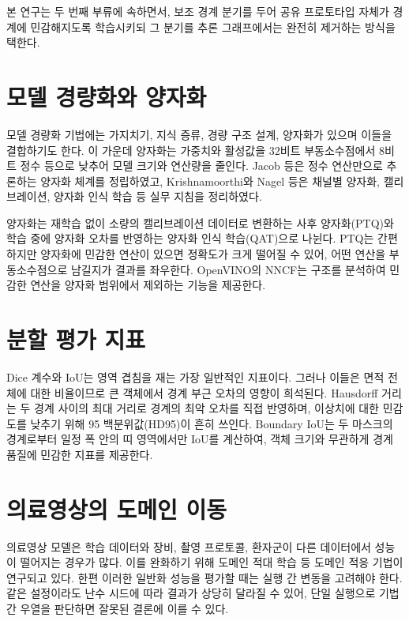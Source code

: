 본 연구는 두 번째 부류에 속하면서, 보조 경계 분기를 두어 공유 프로토타입 자체가 경계에 민감해지도록
학습시키되 그 분기를 추론 그래프에서는 완전히 제거하는 방식을 택한다.

\section{모델 경량화와 양자화}\label{sec:rw_quant}

모델 경량화 기법에는 가지치기, 지식 증류\citep{hinton2015distilling}, 경량 구조 설계, 양자화가 있으며
이들을 결합하기도 한다\citep{han2016deepcompression}. 이 가운데 양자화는 가중치와 활성값을 32비트
부동소수점에서 8비트 정수 등으로 낮추어 모델 크기와 연산량을 줄인다. Jacob 등\citep{jacob2018quantization}은
정수 연산만으로 추론하는 양자화 체계를 정립하였고, Krishnamoorthi\citep{krishnamoorthi2018whitepaper}와
Nagel 등\citep{nagel2021whitepaper}은 채널별 양자화, 캘리브레이션, 양자화 인식 학습 등 실무 지침을 정리하였다.

양자화는 재학습 없이 소량의 캘리브레이션 데이터로 변환하는 사후 양자화(PTQ)와 학습 중에 양자화
오차를 반영하는 양자화 인식 학습(QAT)으로 나뉜다. PTQ는 간편하지만 양자화에 민감한 연산이 있으면
정확도가 크게 떨어질 수 있어, 어떤 연산을 부동소수점으로 남길지가 결과를 좌우한다.
OpenVINO의 NNCF\citep{kozlov2020nncf}는 구조를 분석하여 민감한 연산을 양자화 범위에서 제외하는
기능을 제공한다.

\section{분할 평가 지표}\label{sec:rw_metric}

Dice 계수와 IoU는 영역 겹침을 재는 가장 일반적인 지표이다. 그러나 이들은 면적 전체에 대한 비율이므로
큰 객체에서 경계 부근 오차의 영향이 희석된다\citep{taha2015metrics}. Hausdorff 거리는 두 경계 사이의 최대
거리로 경계의 최악 오차를 직접 반영하며, 이상치에 대한 민감도를 낮추기 위해 95 백분위값(HD95)이 흔히
쓰인다. Boundary IoU\citep{cheng2021boundaryiou}는 두 마스크의 경계로부터 일정 폭 안의 띠 영역에서만 IoU를
계산하여, 객체 크기와 무관하게 경계 품질에 민감한 지표를 제공한다.

\section{의료영상의 도메인 이동}\label{sec:rw_domain}

의료영상 모델은 학습 데이터와 장비, 촬영 프로토콜, 환자군이 다른 데이터에서 성능이 떨어지는 경우가
많다\citep{guan2022domain}. 이를 완화하기 위해 도메인 적대 학습\citep{ganin2015dann} 등 도메인 적응 기법이
연구되고 있다. 한편 이러한 일반화 성능을 평가할 때는 실행 간 변동을 고려해야 한다. 같은 설정이라도
난수 시드에 따라 결과가 상당히 달라질 수 있어, 단일 실행으로 기법 간 우열을 판단하면 잘못된 결론에
이를 수 있다\citep{bouthillier2021variance}.

